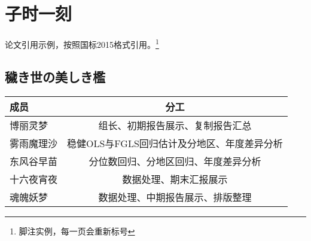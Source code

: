 \chapter{子时一刻}
论文引用示例\cite{王宣承-1}，按照国标2015格式引用。\footnote{脚注实例，每一页会重新标号}

\section{穢き世の美しき檻}
\begin{table}[h]
    \centering
    \begin{tabular}{lc}
        \toprule[1.5pt]
        成员       & 分工                                        \\
        \midrule[1.0pt]
        博丽灵梦   & 组长、初期报告展示、复制报告汇总            \\
        雾雨魔理沙 & 稳健OLS与FGLS回归估计及分地区、年度差异分析 \\
        东风谷早苗 & 分位数回归、分地区回归、年度差异分析        \\
        十六夜宵夜 & 数据处理、期末汇报展示                      \\
        魂魄妖梦   & 数据处理、中期报告展示、排版整理            \\
        \bottomrule[1.5pt]
    \end{tabular}
\end{table}